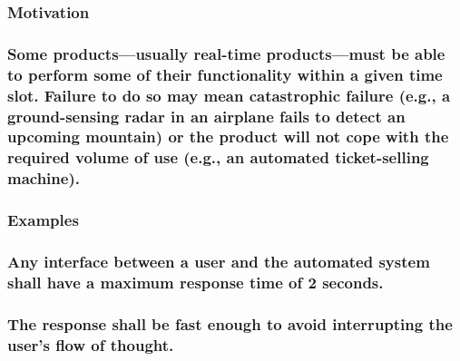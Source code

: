 \documentclass[
]{article}
\begin{document}
\hypertarget{motivation-36}{%
\subsubsection{Motivation}\label{motivation-36}}

\hypertarget{some-productsusually-real-time-productsmust-be-able-to-perform-some-of-their-functionality-within-a-given-time-slot.-failure-to-do-so-may-mean-catastrophic-failure-e.g.-a-ground-sensing-radar-in-an-airplane-fails-to-detect-an-upcoming-mountain-or-the-product-will-not-cope-with-the-required-volume-of-use-e.g.-an-automated-ticket-selling-machine.}{%
\subsubsection{Some products---usually real-time products---must be able
to perform some of their functionality within a given time slot. Failure
to do so may mean catastrophic failure (e.g., a ground-sensing radar in
an airplane fails to detect an upcoming mountain) or the product will
not cope with the required volume of use (e.g., an automated
ticket-selling
machine).}\label{some-productsusually-real-time-productsmust-be-able-to-perform-some-of-their-functionality-within-a-given-time-slot.-failure-to-do-so-may-mean-catastrophic-failure-e.g.-a-ground-sensing-radar-in-an-airplane-fails-to-detect-an-upcoming-mountain-or-the-product-will-not-cope-with-the-required-volume-of-use-e.g.-an-automated-ticket-selling-machine.}}

\hypertarget{examples-21}{%
\subsubsection{Examples}\label{examples-21}}

\hypertarget{any-interface-between-a-user-and-the-automated-system-shall-have-a-maximum-response-time-of-2-seconds.}{%
\subsubsection{Any interface between a user and the automated system
shall have a maximum response time of 2
seconds.}\label{any-interface-between-a-user-and-the-automated-system-shall-have-a-maximum-response-time-of-2-seconds.}}

\hypertarget{the-response-shall-be-fast-enough-to-avoid-interrupting-the-users-flow-of-thought.}{%
\subsubsection{The response shall be fast enough to avoid interrupting
the user's flow of
thought.}\label{the-response-shall-be-fast-enough-to-avoid-interrupting-the-users-flow-of-thought.}}
\end{document}
